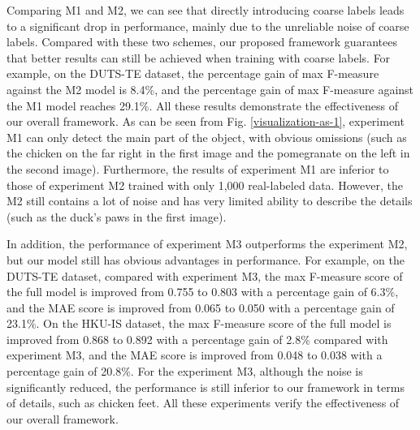 \documentclass[journal]{IEEEtran}
\begin{document}
Comparing M1 and M2, we can see that directly introducing coarse labels leads to a significant drop in performance, mainly due to the unreliable noise of coarse labels.
Compared with these two schemes, our proposed framework guarantees that better results can still be achieved when training with coarse labels.
For example, on the DUTS-TE dataset, the percentage gain of max F-measure against the M2 model is 8.4\%, and the percentage gain of max F-measure against the M1 model reaches 29.1\%. All these results demonstrate the effectiveness of our overall framework. As can be seen from Fig. \ref{visualization-as-1}, experiment M1 can only detect the main part of the object, with obvious omissions (such as the chicken on the far right in the first image and the pomegranate on the left in the second image). Furthermore, the results of experiment M1 are inferior to those of experiment M2 trained with only 1,000 real-labeled data. However, the M2 still contains a lot of noise and has very limited ability to describe the details (such as the duck's paws in the first image).

In addition, the performance of experiment M3 outperforms the experiment M2, but our model still has obvious advantages in performance. For example, on the DUTS-TE dataset, compared with experiment M3, the max F-measure score of the full model is improved from 0.755 to 0.803 with a percentage gain of 6.3\%, and the MAE score is improved from 0.065 to 0.050 with a percentage gain of 23.1\%. On the HKU-IS dataset, the max F-measure score of the full model is improved from 0.868 to 0.892 with a percentage gain of 2.8\% compared with experiment M3, and the MAE score is improved from 0.048 to 0.038 with a percentage gain of 20.8\%.
For the experiment M3, although the noise is significantly reduced, the performance is still inferior to our framework in terms of details, such as chicken feet.
All these experiments verify the effectiveness of our overall framework.
\end{document}
